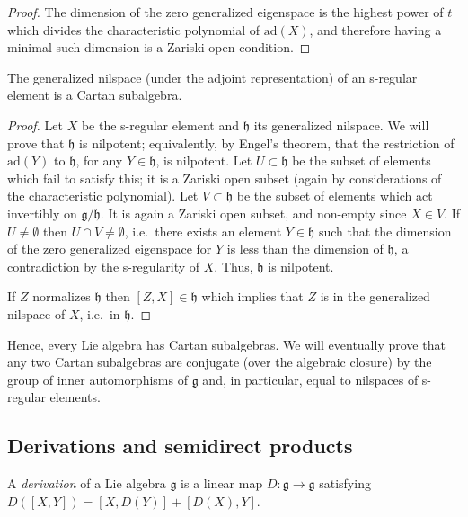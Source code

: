 \begin{proof}
The dimension of the zero generalized eigenspace is the highest power of $t$ which divides the characteristic polynomial of $\text{ad}(X)$, and therefore having a minimal such dimension is a Zariski open condition.
\end{proof}


\begin{proposition}
\label{proposition-CSA-centralizer}
 The generalized nilspace (under the adjoint representation) of an s-regular element is a Cartan subalgebra.
\end{proposition}

\begin{proof}
 Let $X$ be the s-regular element and $\mathfrak h$ its generalized nilspace. We will prove that $\mathfrak h$ is nilpotent; equivalently, by Engel's theorem, that the restriction of $\text{ad}(Y)$ to $\mathfrak h$, for any $Y\in\mathfrak h$, is nilpotent. Let $U\subset\mathfrak h$ be the subset of elements which fail to satisfy this; it is a Zariski open subset (again by considerations of the characteristic polynomial). Let $V\subset\mathfrak h$ be the subset of elements which act invertibly on $\mathfrak g/\mathfrak h$. It is again a Zariski open subset, and non-empty since $X\in V$. If $U\ne\emptyset$ then $U\cap V\ne\emptyset$, i.e.\ there exists an element $Y\in\mathfrak h$ such that the dimension of the zero generalized eigenspace for $Y$ is less than the dimension of $\mathfrak h$, a contradiction by the s-regularity of $X$. Thus, $\mathfrak h$ is nilpotent.

 If $Z$ normalizes $\mathfrak h$ then $[Z,X]\in\mathfrak h$ which implies that $Z$ is in the generalized nilspace of $X$, i.e.\ in $\mathfrak h$.
\end{proof}

Hence, every Lie algebra has Cartan subalgebras. We will eventually prove that any two Cartan subalgebras are conjugate (over the algebraic closure) by the group of inner automorphisms of $\mathfrak g$ and, in particular, equal to nilspaces of s-regular elements.




\subsection{Derivations and semidirect products}
\label{subsection-derivations-semidirect}

\begin{definition}
\label{definition-derivation-Liealgebra}
 A \emph{derivation} of a Lie algebra $\mathfrak g$ is a linear map $D:\mathfrak g\to\mathfrak g$ satisfying $D([X,Y])=[X,D(Y)]+[D(X),Y]$.
\end{definition}


